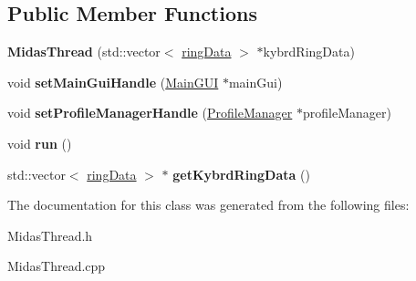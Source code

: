 \subsection*{Public Member Functions}
\begin{DoxyCompactItemize}
\item 
\hypertarget{class_midas_thread_ad75a90b1c86c4aa7968062b784b581b9}{{\bfseries Midas\+Thread} (std\+::vector$<$ \hyperlink{classring_data}{ring\+Data} $>$ $\ast$kybrd\+Ring\+Data)}\label{class_midas_thread_ad75a90b1c86c4aa7968062b784b581b9}

\item 
\hypertarget{class_midas_thread_a610f4f139e8b6fdca73a4ebc7ba7079b}{void {\bfseries set\+Main\+Gui\+Handle} (\hyperlink{class_main_g_u_i}{Main\+G\+U\+I} $\ast$main\+Gui)}\label{class_midas_thread_a610f4f139e8b6fdca73a4ebc7ba7079b}

\item 
\hypertarget{class_midas_thread_a3ac776b42b70f1aec9e743c4eaf4a414}{void {\bfseries set\+Profile\+Manager\+Handle} (\hyperlink{class_profile_manager}{Profile\+Manager} $\ast$profile\+Manager)}\label{class_midas_thread_a3ac776b42b70f1aec9e743c4eaf4a414}

\item 
\hypertarget{class_midas_thread_a455a2bd3ad27ab631fe4c7cf06ed2f9e}{void {\bfseries run} ()}\label{class_midas_thread_a455a2bd3ad27ab631fe4c7cf06ed2f9e}

\item 
\hypertarget{class_midas_thread_ac2e9f82626905e46727dd05a49767d4a}{std\+::vector$<$ \hyperlink{classring_data}{ring\+Data} $>$ $\ast$ {\bfseries get\+Kybrd\+Ring\+Data} ()}\label{class_midas_thread_ac2e9f82626905e46727dd05a49767d4a}

\end{DoxyCompactItemize}


The documentation for this class was generated from the following files\+:\begin{DoxyCompactItemize}
\item 
Midas\+Thread.\+h\item 
Midas\+Thread.\+cpp\end{DoxyCompactItemize}
